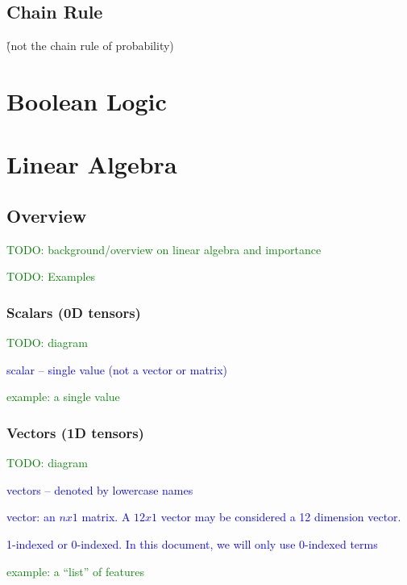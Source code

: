 \subsection{Chain Rule}

\r{(not the chain rule of probability)}



\section{Boolean Logic}




\section{Linear Algebra}

\subsection{Overview}

\textcolor{green}{TODO: background/overview on linear algebra and importance}

\textcolor{green}{TODO: Examples}

\subsubsection{Scalars (0D tensors)}

\textcolor{green}{TODO: diagram}

\textcolor{blue}{scalar -- single value (not a vector or matrix)}

\textcolor{green}{example: a single value}


\subsubsection{Vectors (1D tensors)}

\textcolor{green}{TODO: diagram}

\textcolor{blue}{vectors -- denoted by lowercase names}

\textcolor{blue}{vector: an $n x 1$ matrix. A $12 x 1$ vector may be considered a 12 dimension vector.}

\textcolor{blue}{1-indexed or 0-indexed. In this document, we will only use 0-indexed terms}

\textcolor{green}{example: a ``list'' of features}


